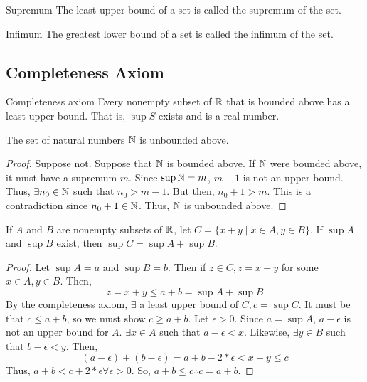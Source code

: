 \begin{definition}{Supremum}{}
    The least upper bound of a set is called the supremum of the set.
\end{definition}
\begin{definition}{Infimum}{}
    The greatest lower bound of a set is called the infimum of the set.
\end{definition}

\subsection{Completeness Axiom}
\begin{definition}{Completeness axiom}{}
    Every nonempty subset of $\mathbb{R}$ that is bounded above has a least upper bound. That is, $\sup S$ exists and is a real number.
\end{definition}

\begin{theorem}{}{}
    The set of natural numbers $\mathbb{N}$ is unbounded above.
\end{theorem}
\begin{proof}
    Suppose not. Suppose that $\mathbb{N}$ is bounded above. If $\mathbb{N}$ were bounded above, it must have a supremum $m$. Since $\sup \mathbb{N} = m$, $m - 1$ is not an upper bound. Thus, $\exists n_0 \in \mathbb{N}$ such that $n_0 > m - 1$. But then, $n_0 + 1 > m$. This is a contradiction since $n_0 + 1 \in \mathbb{N}$. Thus, $\mathbb{N}$ is unbounded above.
\end{proof}

\begin{theorem}{}{}
    If $A$ and $B$ are nonempty subsets of $\mathbb{R}$, let $C = \{x + y \mid x \in A, y \in B\}$. If $\sup A$ and $\sup B$ exist, then $\sup C = \sup A + \sup B$.
\end{theorem}
\begin{proof}
    Let $\sup A = a$ and $\sup B = b$. Then if $z \in C, z = x + y$ for some $x \in A, y \in B$. Then,
    $$ z = x + y \leq a + b = \sup A + \sup B $$
    By the completeness axiom, $\exists$ a least upper bound of $C, c = \sup C$. It must be that $c \leq a + b$, so we must show $c \geq a + b$. Let $\epsilon > 0$. Since $a = \sup A$, $a - \epsilon$ is not an upper bound for $A$. $\exists x \in A$ such that $a - \epsilon < x$. Likewise, $\exists y \in B$ such that $b - \epsilon < y$. Then,
    $$ (a - \epsilon) + (b - \epsilon) = a + b - 2 * \epsilon < x + y \leq c $$
    Thus, $a + b < c + 2 * \epsilon \forall \epsilon > 0$. So, $a + b \leq c \therefore c = a + b$.
\end{proof}